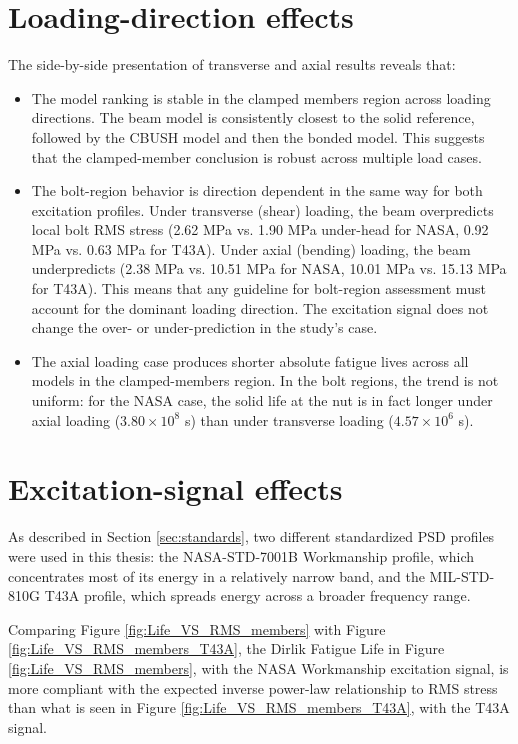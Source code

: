 \documentclass[a4paper,twoside]{bth}
\begin{document}
\section{Loading-direction effects}
The side-by-side presentation of transverse and axial results reveals that:
\begin{itemize}
    \item The model ranking is stable in the clamped members region across loading directions. The beam model is consistently closest to the solid reference, followed by the CBUSH model and then the bonded model. This suggests that the clamped-member conclusion is robust across multiple load cases.
    \item The bolt-region behavior is direction dependent in the same way for both excitation profiles. Under transverse (shear) loading, the beam overpredicts local bolt \ac{RMS} stress (2.62 MPa vs. 1.90 MPa under-head for NASA, 0.92 MPa vs. 0.63 MPa for T43A). Under axial (bending) loading, the beam underpredicts (2.38 MPa vs. 10.51 MPa for NASA, 10.01 MPa vs. 15.13 MPa for T43A). This means that any guideline for bolt-region assessment must account for the dominant loading direction. The excitation signal does not change the over- or under-prediction in the study's case.
    \item The axial loading case produces shorter absolute fatigue lives across all models in the clamped-members region. In the bolt regions, the trend is not uniform: for the NASA case, the solid life at the nut is in fact longer under axial loading ($3.80\times10^8$ s) than under transverse loading ($4.57\times10^6$ s).
\end{itemize}

\newpage
\section{Excitation-signal effects}
As described in  Section \ref{sec:standards}, two different standardized \ac{PSD} profiles were used in this thesis: the NASA-STD-7001B Workmanship profile, which concentrates most of its energy in a relatively narrow band, and the MIL-STD-810G T43A profile, which spreads energy across a broader frequency range.

Comparing Figure \ref{fig:Life_VS_RMS_members} with Figure \ref{fig:Life_VS_RMS_members_T43A}, the Dirlik Fatigue Life in Figure \ref{fig:Life_VS_RMS_members}, with the  NASA Workmanship excitation signal, is more compliant with the expected inverse power-law relationship to \ac{RMS} stress than what is seen in Figure \ref{fig:Life_VS_RMS_members_T43A}, with the T43A signal.
\end{document}
